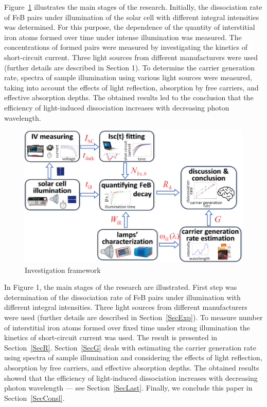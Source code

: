 \documentclass{WileyMSP-template}
\begin{document}
Figure~\ref{fig1} illustrates the main stages of the research. Initially, the dissociation rate of FeB pairs under illumination of the solar cell with different integral intensities was determined. For this purpose, the dependence of the quantity of interstitial iron atoms formed over time under intense illumination was measured. The concentrations of formed pairs were measured by investigating the kinetics of short-circuit current. Three light sources from different manufacturers were used (further details are described in Section 1).
To determine the carrier generation rate, spectra of sample illumination using various light sources were measured, taking into account the effects of light reflection, absorption by free carriers, and effective absorption depths. The obtained results led to the conclusion that the efficiency of light-induced dissociation increases with decreasing photon wavelength.

\begin{figure}
\centering
  \includegraphics[width=0.5\linewidth]{Fig1.png}
  \caption{Investigation framework}
  \label{fig1}
\end{figure}

In Figure 1, the main stages of the research are illustrated.
First step was determination of the dissociation rate of FeB pairs under illumination with different integral intensities.
Three light sources from different manufacturers were used (further details are described in Section~\ref{SecExp}).
To measure number of interstitial iron atoms formed over fixed time under strong illumination the kinetics of short-circuit current was used.
The result is presented in Section~\ref{SecR}.
Section~\ref{SecG} deals with estimating the carrier generation rate using spectra of sample illumination and considering the effects of light reflection, absorption by free carriers, and effective absorption depths.
The obtained results showed that the efficiency of light-induced dissociation increases with decreasing photon wavelength --- see Section~\ref{SecLast}.
Finally, we conclude this paper in Section~\ref{SecConsl}.

%
%
%
%
\end{document}
